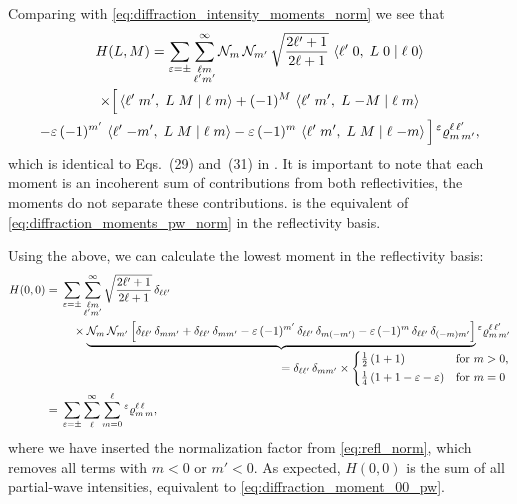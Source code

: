 Comparing with \cref{eq:diffraction_intensity_moments_norm} we see
that
\begin{multline}
  \label{eq:diffraction_moments_pw_refl_norm}
  H(L, M)
  = \sum_{\varepsilon = \pm} \sum_{\substack{\ell m \\ \ell' m'}}^\infty
  \mathcal{N}_m\, \mathcal{N}_{m'}\,
  \sqrt{\frac{2 \ell' + 1}{2 \ell + 1}}\,
  \braket{{\ell'}\;{0},\;{L}\;{0}\; |\; {\ell}\;{0}}
  \\
  \times \Big[
    \braket{{\ell'}\;{m'},\;{L}\;{M}\; |\; {\ell}\;{m}}
    + (-1)^M\, \braket{{\ell'}\;{m'},\;{L}\;{-M}\; |\; {\ell}\;{m}}
    \\
    - \varepsilon\, (-1)^{m'}\, \braket{{\ell'}\;{-m'},\;{L}\;{M}\; |\; {\ell}\;{m}}
    - \varepsilon\, (-1)^m\, \braket{{\ell'}\;{m'},\;{L}\;{M}\; |\; {\ell}\;{-m}} \Big]
  \prescript{\ensuremath{\varepsilon}}{}{\varrho}^{\ell\, \ell'}_{m\, m'},
\end{multline}
which is identical to Eqs.~(29) and~(31) in .
It is important to note that each moment is an incoherent sum of
contributions from both reflectivities, \ie the moments do not
separate these contributions.
 is the equivalent of
\cref{eq:diffraction_moments_pw_norm} in the reflectivity basis.

Using the above, we can calculate the lowest moment in the
reflectivity basis:
\begin{align}
  H(0, 0)
  ={}& \begin{multlined}[t]
    \sum_{\refl = \pm} \sum_{\substack{\ell m \\ \ell' m'}}^\infty
    \sqrt{\frac{2 \ell' + 1}{2 \ell + 1}}\,
    \delta_{\ell \ell'}
    \\
    \times \rdUnderbrace{\mathcal{N}_m\, \mathcal{N}_{m'} \sBrk[2]{%
      \delta_{\ell \ell'}\, \delta_{m m'}
      + \delta_{\ell \ell'}\, \delta_{m m'}
      - \refl\, (-1)^{m'}\, \delta_{\ell \ell'}\, \delta_{m (-m')}
      - \refl\, (-1)^m\, \delta_{\ell \ell'}\, \delta_{(-m) m'}}}%
      {= \delta_{\ell \ell'}\, \delta_{m m'} \times
      \begin{cases*}
        \frac{1}{2}\, (1 + 1)                 & for $m > 0$, \\
        \frac{1}{4}\, (1 + 1 - \refl - \refl) & for $m = 0$
      \end{cases*}}
    \prescript{\refl}{}{\varrho}^{\ell\, \ell'}_{m\, m'}
  \end{multlined} \nonumber
  \\
  \label{eq:diffraction_moment_00_pw_refl}
  ={}& \sum_{\refl = \pm} \sum_\ell^\infty \sum_{m = 0}^\ell \prescript{\refl}{}{\varrho}^{\ell\, \ell}_{m\, m},
\end{align}
where we have inserted the normalization factor from
\cref{eq:refl_norm}, which removes all terms with $m < 0$ or $m' < 0$.
As expected, $H(0, 0)$ is the sum of all partial-wave intensities,
equivalent to \cref{eq:diffraction_moment_00_pw}.


